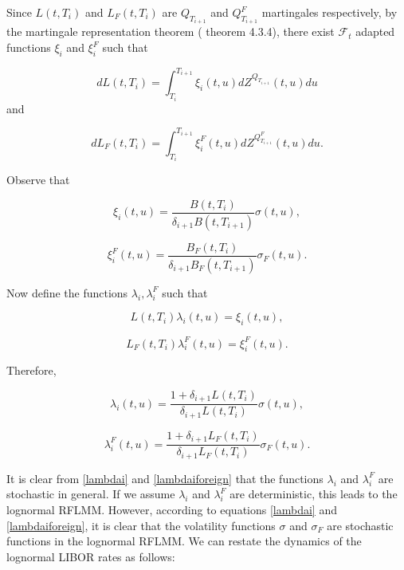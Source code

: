 \documentclass[11pt]{article}
\newcommand{\filt}{\ensuremath{\mathcal{F}}}
\begin{document}
Since $L(t,T_i)$ and $L_F(t,T_{i})$ are $Q_{T_{i+1}}$ and $Q^F_{T_{i+1}}$ martingales respectively, by the martingale representation theorem (\cite{oks} theorem 4.3.4), there exist $\filt_t$ adapted functions $\xi_i$ and $\xi_i^F$ such that 

\begin{equation}
    dL(t,T_i)=\int_{T_i}^{T_{i+1}}\xi_i(t,u)dZ^{Q_{T_{i+1}}}(t,u)du
\end{equation}
and


\begin{equation}\label{flibor}
    dL_F(t,T_i)=\int_{T_i}^{T_{i+1}}\xi_i^F(t,u)dZ^{Q^F_{T_{i+1}}}(t,u)du.
\end{equation}

Observe that 

\begin{equation*}
    \xi_i(t,u)=\frac{B(t,T_{i})}{\delta_{i+1} B(t,T_{i+1})}\sigma(t,u),
\end{equation*}

\begin{equation*}
    \xi^F_i(t,u)=\frac{B_F(t,T_{i})}{\delta_{i+1} B_F(t,T_{i+1})}\sigma_F(t,u).
\end{equation*}

Now define the functions $\lambda_i,\lambda_i^F$ such that 

\begin{equation*}
    L(t,T_i)\lambda_i(t,u)=\xi_i(t,u),
\end{equation*}

\begin{equation*}
    L_F(t,T_i)\lambda^F_i(t,u)=\xi^F_i(t,u).
\end{equation*}

Therefore, 


\begin{equation}\label{lambdai}
    \lambda_i(t,u)=\frac{1+\delta_{i+1}L(t,T_i)}{\delta_{i+1}L(t,T_i)}\sigma(t,u),
\end{equation}

\begin{equation}\label{lambdaiforeign}
    \lambda^F_i(t,u)=\frac{1+\delta_{i+1}L_F(t,T_i)}{\delta_{i+1}L_F(t,T_i)}\sigma_F(t,u).
\end{equation}

It is clear from \eqref{lambdai} and \eqref{lambdaiforeign} that the functions $\lambda_i$ and $\lambda_i^F$ are stochastic in general. If we assume $\lambda_i$ and $\lambda_i^F$ are deterministic, this leads to the lognormal RFLMM. However, according to equations \eqref{lambdai} and \eqref{lambdaiforeign}, it is clear that the volatility functions $\sigma$ and $\sigma_F$ are stochastic functions in the lognormal RFLMM. We can restate the dynamics of the lognormal LIBOR rates as follows: 
\end{document}
